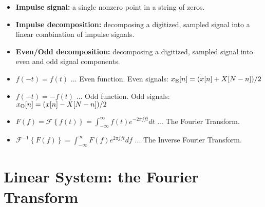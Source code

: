 \documentclass{article}
\begin{document}
\begin{itemize}
\item \textbf{Impulse signal:} a single nonzero point in a string of zeros.
\item \textbf{Impulse decomposition:} decomposing a digitized, sampled signal into a linear combination of impulse signals.
\item \textbf{Even/Odd decomposition:} decomposing a digitized, sampled signal into even and odd signal components.
\item $f(-t) = f(t)$ ... Even function.  Even signals: $x_{\rm E}[n] = (x[n] + X[N-n])/2$
\item $f(-t) = -f(t)$ ... Odd function.  Odd signals: $x_{\rm O}[n] = (x[n] - X[N-n])/2$
\item $F(f) = \mathcal{F}\left\lbrace f(t)\right\rbrace =\int_{-\infty}^{\infty} f(t) e^{-2\pi jft} dt$ ... The Fourier Transform.
\item $\mathcal{F}^{-1}\left\lbrace F(f)\right\rbrace =\int_{-\infty}^{\infty} F(f) e^{2\pi jft} df$ ... The Inverse Fourier Transform.
\end{itemize}
\vspace{3cm}

\section{Linear System: the Fourier \\ Transform}
\end{document}
